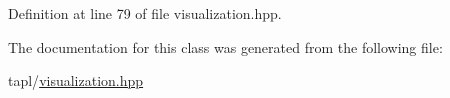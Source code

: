 Definition at line 79 of file visualization.\+hpp.



The documentation for this class was generated from the following file\+:\begin{DoxyCompactItemize}
\item 
tapl/\hyperlink{visualization_8hpp}{visualization.\+hpp}\end{DoxyCompactItemize}
